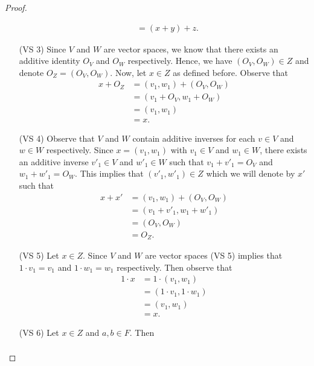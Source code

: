 \begin{proof}
\begin{enumerate}
\begin{align*}
                      &=  (x+y) + z.
        \end{align*}
    \item[(VS 3)] Since \( V  \) and \( W  \) are vector spaces, we know that there exists an additive identity \( O_{V}   \) and \( O_{W} \) respectively. Hence,  we have \( (O_{V}, O_{W}) \in Z  \) and denote \( O_{Z} = (O_{V }, O_{W}) \). Now, let \( x \in Z  \) as defined before. Observe that 
        \begin{align*} 
            x + O_{Z} &= (v_{1}, w_{1}) + (O_{V}, O_{W})   \\
                      &= (v_{1} + O_{V}, w_{1} + O_{W}) \\
                      &= (v_{1}, w_{1}) \\
                      &= x.
        \end{align*}
    \item[(VS 4)] Observe that \( V  \) and \( W  \) contain additive inverses for each \( v \in V  \) and \( w \in W  \) respectively. Since \( x = (v_{1}, w_{1}) \) with \( v_{1} \in V  \) and \( w_{1} \in W  \), there exists an additive inverse \( v'_{1} \in V   \) and \( w'_{1} \in W  \) such that \( v_{1} + v'_{1} = O_{V}  \) and \( w_{1} + w'_{1} = O_{W} \). This implies that \( (v'_{1}, w'_{1}) \in Z  \) which we will denote by \( x' \) such that 
        \begin{align*}
        x + x' &= (v_{1}, w_{1})  +(O_{V}, O_{W})   \\
               &= (v_{1} + v'_{1} , w_{1} + w'_{1} ) \\
               &= (O_{V}, O_{W}) \\
               &= O_{Z}.
    \end{align*}
    \item[(VS 5)] Let \( x \in Z  \). Since \( V  \) and \( W  \) are vector spaces (VS 5) implies that \( 1 \cdot v_{1} = v_{1}  \) and \( 1 \cdot w_{1} = w_{1}  \) respectively. Then observe that 
        \begin{align*}
            1 \cdot x &= 1 \cdot (v_{1}, w_{1}) \\
                      &= (1 \cdot v_{1}, 1 \cdot w_{1}) \\
                      &= (v_{1}, w_{1}) \\
                      &= x.
        \end{align*}
    \item[(VS 6)] Let \( x \in Z  \) and \( a,b \in F  \). Then 
        \begin{align*}

\end{align*}
\end{enumerate}
\end{proof}
